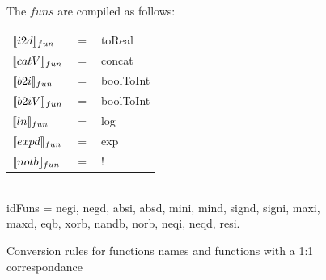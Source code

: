 \documentclass[11pt]{article}
\begin{document}
\begin{figure}
The $funs$ are compiled as follows:\\
\begin{tabular}{l c l}
$\llbracket i2d \rrbracket_{fun}$ & $=$ & toReal\\ 
$\llbracket catV \rrbracket_{fun}$ & $=$ & concat\\ 
$\llbracket b2i \rrbracket_{fun}$ & $=$ & boolToInt\\ 
$\llbracket b2iV \rrbracket_{fun}$ & $=$ & boolToInt\\ 
$\llbracket ln \rrbracket_{fun}$ & $=$ & log\\ 
$\llbracket expd \rrbracket_{fun}$ & $=$ & exp\\ 
$\llbracket notb \rrbracket_{fun}$ & $=$ & !\\ 
\end{tabular}\\


idFuns = negi, negd, absi, absd, mini, mind, signd, signi, maxi, maxd, eqb, xorb, nandb, norb, neqi, neqd, resi.
\caption{Conversion rules for functions names and functions with a 1:1 correspondance}
\label{fig:funs}
\end{figure}
\end{document}
